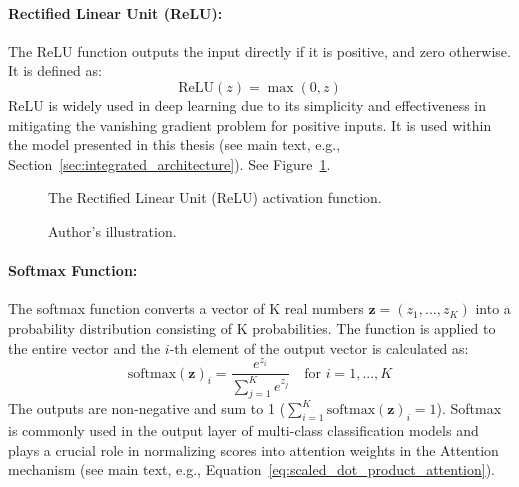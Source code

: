 \begin{appendices}
  \paragraph{Rectified Linear Unit (ReLU):}
  The ReLU function outputs the input directly if it is positive, and zero otherwise. It is defined as:
  \begin{equation}
    \text{ReLU}(z) = \max(0, z) %
  \end{equation}
  ReLU is widely used in deep learning due to its simplicity and effectiveness in mitigating the vanishing gradient problem for positive inputs. It is used within the model presented in this thesis (see main text, e.g., Section~\ref{sec:integrated_architecture}). See Figure~\ref{fig:relu_plot}.

  \begin{figure}[htbp]
    \centering
    \caption[ReLU activation function]{The Rectified Linear Unit (ReLU) activation function.}
    \label{fig:relu_plot} %
    \caption*{Author's illustration.}
  \end{figure}


  \paragraph{Softmax Function:}
  The softmax function converts a vector of K real numbers \( \bm{z} = (z_1, ..., z_K) \) into a probability distribution consisting of K probabilities. The function is applied to the entire vector and the \( i \)-th element of the output vector is calculated as:
  \begin{equation}
    \text{softmax}(\bm{z})_i = \frac{e^{z_i}}{\sum_{j=1}^K e^{z_j}} \quad \text{for } i = 1, ..., K %
  \end{equation}
  The outputs are non-negative and sum to 1 (\( \sum_{i=1}^K \text{softmax}(\bm{z})_i = 1 \)). Softmax is commonly used in the output layer of multi-class classification models and plays a crucial role in normalizing scores into attention weights in the Attention mechanism (see main text, e.g., Equation~\ref{eq:scaled_dot_product_attention}).


\end{appendices}
